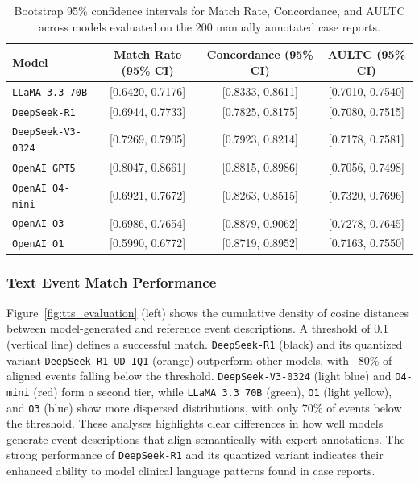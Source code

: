 \begin{table}[ht!]
\centering
\caption{Bootstrap 95\% confidence intervals for Match Rate, Concordance, and AULTC across models evaluated on the 200 manually annotated case reports.}
\label{tab:bootstrap_intervals}
\begin{tabular}{lccc}
\hline
\textbf{Model} & \textbf{Match Rate (95\% CI)} & \textbf{Concordance (95\% CI)} & \textbf{AULTC (95\% CI)} \\
\hline
\texttt{LLaMA 3.3 70B}      & [0.6420, 0.7176] & [0.8333, 0.8611] & [0.7010, 0.7540] \\
\texttt{DeepSeek-R1}        & [0.6944, 0.7733] & [0.7825, 0.8175] & [0.7080, 0.7515] \\
\texttt{DeepSeek-V3-0324}   & [0.7269, 0.7905] & [0.7923, 0.8214] & [0.7178, 0.7581] \\
\texttt{OpenAI GPT5}        & [0.8047, 0.8661] & [0.8815, 0.8986] & [0.7056, 0.7498] \\
\texttt{OpenAI O4-mini}     & [0.6921, 0.7672] & [0.8263, 0.8515] & [0.7320, 0.7696] \\
\texttt{OpenAI O3}          & [0.6986, 0.7654] & [0.8879, 0.9062] & [0.7278, 0.7645] \\
\texttt{OpenAI O1}          & [0.5990, 0.6772] & [0.8719, 0.8952] & [0.7163, 0.7550] \\
\hline
\end{tabular}
\end{table}



\subsubsection{Text Event Match Performance}
Figure~\ref{fig:tts_evaluation} (left) shows the cumulative density of cosine distances between model-generated and reference event descriptions. A threshold of 0.1 (vertical line) defines a successful match. \texttt{DeepSeek-R1} (black) and its quantized variant \texttt{DeepSeek-R1-UD-IQ1} (orange) outperform other models, with ~80\% of aligned events falling below the threshold. \texttt{DeepSeek-V3-0324} (light blue) and \texttt{O4-mini} (red) form a second tier, while \texttt{LLaMA 3.3 70B} (green), \texttt{O1} (light yellow), and \texttt{O3} (blue) show more dispersed distributions, with only 70\% of events below the threshold. These analyses highlights clear differences in how well models generate event descriptions that align semantically with expert annotations. The strong performance of \texttt{DeepSeek-R1} and its quantized variant indicates their enhanced ability to model clinical language patterns found in case reports.


